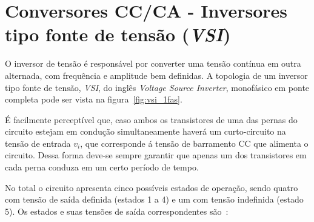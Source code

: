 \documentclass[
	12pt,				%
	openright,			%
	twoside,			%
	a4paper,			%
	english,			%
	french,				%
	spanish,			%
	brazil,				%
	]{abntex2}
\begin{document}
\section{Conversores CC/CA - Inversores tipo fonte de tensão (\textit{VSI})}




O inversor de tensão é responsável por converter uma tensão contínua em outra alternada, com frequência e amplitude bem definidas. A topologia de um inversor tipo fonte de tensão, \emph{VSI}, do inglês \textit{Voltage Source Inverter}, monofásico em ponte completa pode ser vista na figura~\ref{fig:vsi_1fas}. 

É facilmente perceptível que, caso ambos os transistores de uma das pernas do circuito estejam em condução simultaneamente haverá um curto-circuito na tensão de entrada $v_i$, que corresponde á tensão de barramento CC que alimenta o circuito. Dessa forma deve-se sempre garantir que apenas um dos transistores em cada perna conduza em um certo período de tempo.

No total o circuito apresenta cinco possíveis estados de operação, sendo quatro com tensão de saída definida (estados 1 a 4) e um com tensão indefinida (estado 5). Os estados e suas tensões de saída correspondentes são~\cite{RASHID_VSI}:
\end{document}
